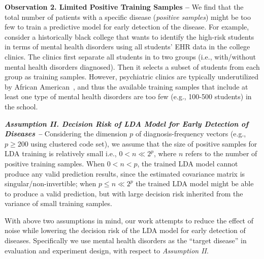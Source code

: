 \textbf{Observation 2.  Limited Positive Training Samples -- } We find that the total number of patients with a specific disease (\emph{positive samples}) might be too few to train a predictive model for early detection of the disease.
For example, consider a historically black college that wants to identify the high-risk students in terms of mental health disorders using all students' EHR data in the college clinics.
The clinics first separate all students in to two groups (i.e., with/without mental health disorders diagnosed).
Then it selects a subset of students from each group as training samples.
However, psychiatric clinics are typically underutilized by African American~\cite{thompson2004african}, and thus the available training samples that include at least one type of mental health disorders are too few (e.g., 100-500 students) in the school.



\textbf{\em Assumption II.  Decision Risk of LDA Model for Early Detection of Diseases -- } Considering the dimension $p$ of diagnosis-frequency vectors (e.g., $p\geq 200$ using clustered code set), we assume that the size of positive samples for LDA training is relatively small i.e., $0<n\ll 2^p$, where $n$ refers to the number of positive training samples.
When $0<n<p$, the trained LDA model cannot produce any valid prediction results, since the estimated covariance matrix is singular/non-invertible; when $p\leq n\ll 2^p$ the trained LDA model might be able to produce a valid prediction, but with large decision risk inherited from the variance of small training samples.
 

With above two assumptions in mind, our work attempts to reduce the effect of noise while lowering the decision risk of the LDA model for early detection of diseases.
Specifically we use mental health disorders as the ``target disease'' in evaluation and experiment design, with respect to  {\em Assumption II}.


